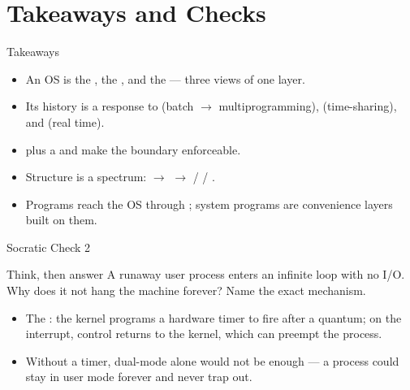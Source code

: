 \documentclass[aspectratio=169]{beamer}
\begin{document}
\section{Takeaways and Checks}

\begin{frame}{Takeaways}
  \begin{itemize}
    \item An OS is the , the , and
      the  --- three views of one layer.
    \item Its history is a response to  (batch
      $\to$ multiprogramming),  (time-sharing), and
       (real time).
    \item {} plus a  and  make the boundary enforceable.
    \item Structure is a spectrum:  $\to$ 
      $\to$  /  / .
    \item Programs reach the OS through ; system programs are
      convenience layers built on them.
  \end{itemize}
\end{frame}

\begin{frame}{Socratic Check 2}
  \begin{block}{Think, then answer}
    A runaway user process enters an infinite loop with no I/O. Why does it not
    hang the machine forever? Name the exact mechanism.
  \end{block}
  \vspace{0.2cm}
  \begin{itemize}
    \item The : the kernel programs a hardware timer to
      fire after a quantum; on the interrupt, control returns to the kernel,
      which can preempt the process.
    \item Without a timer, dual-mode alone would not be enough --- a process
      could stay in user mode forever and never trap out.
  \end{itemize}
\end{frame}
\end{document}
